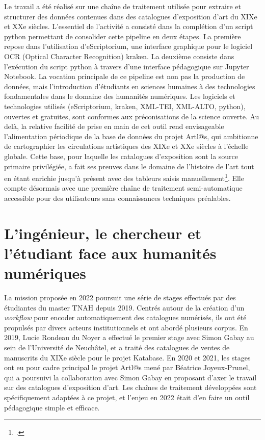 \documentclass[a4paper,12pt,twoside]{book}
\begin{document}
Le travail a été réalisé sur une chaîne de traitement utilisée pour extraire et structurer des données contenues dans des catalogues d'exposition d'art du XIXe et XXe siècles. L'essentiel de l'activité a consisté\label{key} dans la complétion d'un script python permettant  de consolider cette pipeline en deux étapes. La première repose dans l'utilisation d'eScriptorium, une interface graphique pour le logiciel OCR (Optical Character Recognition) kraken. La deuxième consiste dans l'exécution du script python à travers d'une interface pédagogique sur Jupyter Notebook. La vocation principale de ce pipeline est non pas la production de données, mais l'introduction d'étudiants en sciences humaines à des technologies fondamentales dans le domaine des humanités numériques. Les logiciels et technologies utilisés (eScriptorium, kraken, XML-TEI, XML-ALTO, python), ouvertes et gratuites, sont conformes aux préconisations de la science ouverte. Au delà, la relative facilité de prise en main de cet outil rend envisageable l'alimentation périodique de la base de données du projet Artl@s, qui ambitionne de cartographier les circulations artistiques des XIXe et XXe siècles à l'échelle globale. Cette base, pour laquelle les catalogues d'exposition sont la source primaire privilégiée, a fait ses preuves dans le domaine de l'histoire de l'art tout en étant enrichie jusqu'à présent avec des tableurs saisis manuellement\footcite{topalov_automating_2020}. Elle compte désormais avec une première chaîne de traitement semi-automatique accessible pour des utilisateurs sans connaissances techniques préalables. 



\section*{L'ingénieur, le chercheur et l'étudiant face aux humanités numériques}

La mission proposée en 2022 poursuit une série de stages effectués par des étudiantes du master TNAH depuis 2019. Centrés autour de la création d'un \textit{workflow} pour encoder automatiquement des catalogues numérisés, ils ont été propulsés par divers acteurs institutionnels et ont abordé plusieurs corpus. En 2019, Lucie Rondeau du Noyer a effectué le premier stage avec Simon Gabay au sein de l'Université de Neuchâtel, et a traité des catalogues de ventes de manuscrits du XIXe siècle pour le projet Katabase. En 2020 et 2021, les stages ont eu pour cadre principal le projet Artl@s mené par Béatrice Joyeux-Prunel, qui a poursuivi la collaboration avec Simon Gabay en proposant d'axer le travail sur des catalogues d'exposition d'art. Les chaînes de traitement développées sont spécifiquement adaptées à ce projet, et l'enjeu en 2022 était d'en faire un outil pédagogique simple et efficace. 
\end{document}
